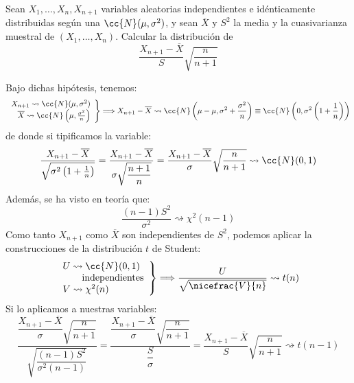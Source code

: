 \begin{ejercicio}
    Sean $X_1, \ldots, X_n, X_{n+1}$ variables aleatorias independientes e idénticamente distribuidas según una $\cc{N}(\mu, \sigma^2)$, y sean $\overline{X}$ y $S^2$ la media y la cuasivarianza muestral de $(X_1, \ldots, X_n)$. Calcular la distribución de
    \begin{equation*}
        \dfrac{X_{n+1}- \overline{X}}{S}\sqrt{\dfrac{n}{n+1}}
    \end{equation*}

    \noindent
    Bajo dichas hipótesis, tenemos:
    \begin{equation*}
        \left.\begin{array}{r}
            X_{n+1} \rightsquigarrow \cc{N}(\mu, \sigma^2) \\
            \overline{X} \rightsquigarrow \cc{N}\left(\mu, \frac{\sigma^2}{n}\right)
    \end{array}\right\}\Longrightarrow X_{n+1}-\overline{X} \rightsquigarrow\cc{N}\left(\mu-\mu, \sigma^2 + \frac{\sigma^2}{n}\right) \equiv \cc{N}\left(0, \sigma^2\left(1+\frac{1}{n}\right)\right)
    \end{equation*}
    de donde si tipificamos la variable:
    \begin{equation*}
        \dfrac{X_{n+1}-\overline{X}}{\sqrt{\sigma^2\left(1+\frac{1}{n}\right)}} = \dfrac{X_{n+1}-\overline{X}}{\sigma\sqrt{\dfrac{n+1}{n}}} = \dfrac{X_{n+1}-\overline{X}}{\sigma}\sqrt{\dfrac{n}{n+1}}\rightsquigarrow \cc{N}(0,1)
    \end{equation*}
    Además, se ha visto en teoría que:
    \begin{equation*}
        \dfrac{(n-1)S^2}{\sigma^2} \rightsquigarrow\chi^2(n-1)
    \end{equation*}
    Como tanto $X_{n+1}$ como $\overline{X}$ son independientes de $S^2$, podemos aplicar la construcciones de la distribución $t$ de Student:
    \begin{equation*}
        \left.\begin{array}{l}
                U\rightsquigarrow \cc{N}(0,1) \\
                \qquad \text{independientes} \\
                V\rightsquigarrow\chi^2(n)
        \end{array}\right\} \Longrightarrow \dfrac{U}{\sqrt{\nicefrac{V}{n}}} \rightsquigarrow t(n)
    \end{equation*}
    Si lo aplicamos a nuestras variables:
    \begin{equation*}
        \dfrac{\dfrac{X_{n+1}-\overline{X}}{\sigma}\sqrt{\dfrac{n}{n+1}}}{\sqrt{\dfrac{(n-1)S^2}{\sigma^2(n-1)}}} = \dfrac{\dfrac{X_{n+1}-\overline{X}}{\sigma}\sqrt{\dfrac{n}{n+1}}}{\dfrac{S}{\sigma}} = \dfrac{X_{n+1}- \overline{X}}{S}\sqrt{\dfrac{n}{n+1}} \rightsquigarrow t(n-1)
    \end{equation*}
\end{ejercicio}

